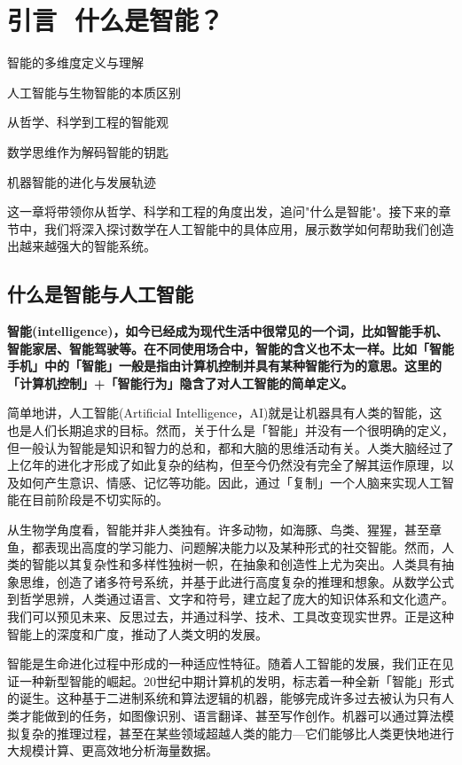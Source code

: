 \chapter*{ 引言\,\,  什么是智能？}
 \begin{introduction}
  \item 智能的多维度定义与理解
  \item 人工智能与生物智能的本质区别
  \item 从哲学、科学到工程的智能观
  \item 数学思维作为解码智能的钥匙
  \item 机器智能的进化与发展轨迹
\end{introduction}

这一章将带领你从哲学、科学和工程的角度出发，追问"什么是智能"。接下来的章节中，我们将深入探讨数学在人工智能中的具体应用，展示数学如何帮助我们创造出越来越强大的智能系统。

\section{什么是智能与人工智能}

{\textbf{智能(intelligence)，如今已经成为现代生活中很常见的一个词，比如智能手机、智能家居、智能驾驶等。在不同使用场合中，智能的含义也不太一样。比如「智能手机」中的「智能」一般是指由计算机控制并具有某种智能行为的意思。这里的「计算机控制」+「智能行为」隐含了对人工智能的简单定义。}}

简单地讲，人工智能(Artificial Intelligence，AI)就是让机器具有人类的智能，这也是人们长期追求的目标。然而，关于什么是「智能」并没有一个很明确的定义，但一般认为智能是知识和智力的总和，都和大脑的思维活动有关。人类大脑经过了上亿年的进化才形成了如此复杂的结构，但至今仍然没有完全了解其运作原理，以及如何产生意识、情感、记忆等功能。因此，通过「复制」一个人脑来实现人工智能在目前阶段是不切实际的。

从生物学角度看，智能并非人类独有。许多动物，如海豚、鸟类、猩猩，甚至章鱼，都表现出高度的学习能力、问题解决能力以及某种形式的社交智能。然而，人类的智能以其复杂性和多样性独树一帜，在抽象和创造性上尤为突出。人类具有抽象思维，创造了诸多符号系统，并基于此进行高度复杂的推理和想象。从数学公式到哲学思辨，人类通过语言、文字和符号，建立起了庞大的知识体系和文化遗产。我们可以预见未来、反思过去，并通过科学、技术、工具改变现实世界。正是这种智能上的深度和广度，推动了人类文明的发展。

智能是生命进化过程中形成的一种适应性特征。随着人工智能的发展，我们正在见证一种新型智能的崛起。20世纪中期计算机的发明，标志着一种全新「智能」形式的诞生。这种基于二进制系统和算法逻辑的机器，能够完成许多过去被认为只有人类才能做到的任务，如图像识别、语言翻译、甚至写作创作。机器可以通过算法模拟复杂的推理过程，甚至在某些领域超越人类的能力---它们能够比人类更快地进行大规模计算、更高效地分析海量数据。


